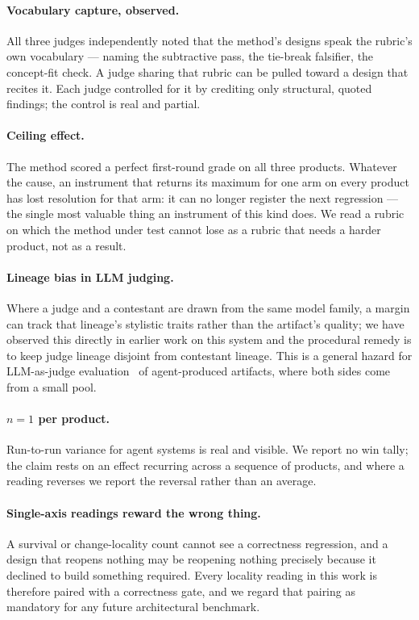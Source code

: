 \documentclass[11pt]{article}
\begin{document}
\paragraph{Vocabulary capture, observed.} All three judges independently noted that the method's designs speak the rubric's own vocabulary --- naming the subtractive pass, the tie-break falsifier, the concept-fit check. A judge sharing that rubric can be pulled toward a design that recites it. Each judge controlled for it by crediting only structural, quoted findings; the control is real and partial.

\paragraph{Ceiling effect.} The method scored a perfect first-round grade on all three products. Whatever the cause, an instrument that returns its maximum for one arm on every product has lost resolution for that arm: it can no longer register the next regression --- the single most valuable thing an instrument of this kind does. We read a rubric on which the method under test cannot lose as a rubric that needs a harder product, not as a result.

\paragraph{Lineage bias in LLM judging.} Where a judge and a contestant are drawn from the same model family, a margin can track that lineage's stylistic traits rather than the artifact's quality; we have observed this directly in earlier work on this system and the procedural remedy is to keep judge lineage disjoint from contestant lineage. This is a general hazard for LLM-as-judge evaluation~\cite{zheng2023judging} of agent-produced artifacts, where both sides come from a small pool.

\paragraph{$n=1$ per product.} Run-to-run variance for agent systems is real and visible. We report no win tally; the claim rests on an effect recurring across a sequence of products, and where a reading reverses we report the reversal rather than an average.

\paragraph{Single-axis readings reward the wrong thing.} A survival or change-locality count cannot see a correctness regression, and a design that reopens nothing may be reopening nothing precisely because it declined to build something required. Every locality reading in this work is therefore paired with a correctness gate, and we regard that pairing as mandatory for any future architectural benchmark.
\end{document}
